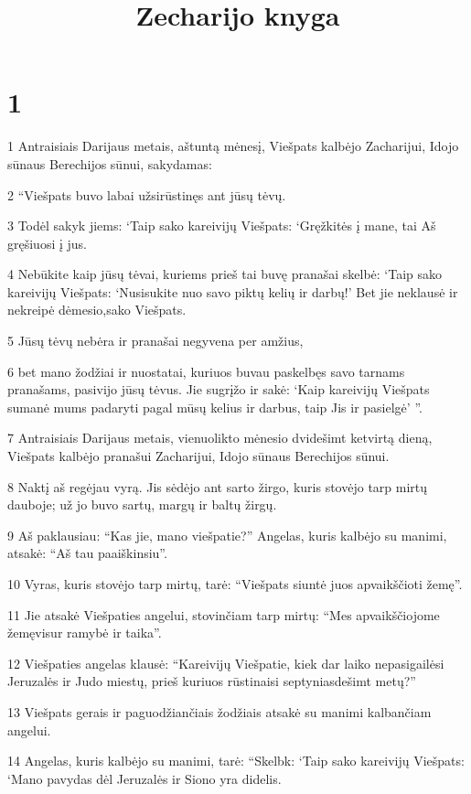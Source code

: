 

\title{Zecharijo knyga}

\chapter{1}


\par 1 Antraisiais Darijaus metais, aštuntą mėnesį, Viešpats kalbėjo Zacharijui, Idojo sūnaus Berechijos sūnui, sakydamas: 
\par 2 “Viešpats buvo labai užsirūstinęs ant jūsų tėvų. 
\par 3 Todėl sakyk jiems: ‘Taip sako kareivijų Viešpats: ‘Gręžkitės į mane, tai Aš gręšiuosi į jus. 
\par 4 Nebūkite kaip jūsų tėvai, kuriems prieš tai buvę pranašai skelbė: ‘Taip sako kareivijų Viešpats: ‘Nusisukite nuo savo piktų kelių ir darbų!’ Bet jie neklausė ir nekreipė dėmesio,­sako Viešpats.­ 
\par 5 Jūsų tėvų nebėra ir pranašai negyvena per amžius, 
\par 6 bet mano žodžiai ir nuostatai, kuriuos buvau paskelbęs savo tarnams pranašams, pasivijo jūsų tėvus. Jie sugrįžo ir sakė: ‘Kaip kareivijų Viešpats sumanė mums padaryti pagal mūsų kelius ir darbus, taip Jis ir pasielgė’ ”. 
\par 7 Antraisiais Darijaus metais, vienuolikto mėnesio dvidešimt ketvirtą dieną, Viešpats kalbėjo pranašui Zacharijui, Idojo sūnaus Berechijos sūnui. 
\par 8 Naktį aš regėjau vyrą. Jis sėdėjo ant sarto žirgo, kuris stovėjo tarp mirtų dauboje; už jo buvo sartų, margų ir baltų žirgų. 
\par 9 Aš paklausiau: “Kas jie, mano viešpatie?” Angelas, kuris kalbėjo su manimi, atsakė: “Aš tau paaiškinsiu”. 
\par 10 Vyras, kuris stovėjo tarp mirtų, tarė: “Viešpats siuntė juos apvaikščioti žemę”. 
\par 11 Jie atsakė Viešpaties angelui, stovinčiam tarp mirtų: “Mes apvaikščiojome žemę­visur ramybė ir taika”. 
\par 12 Viešpaties angelas klausė: “Kareivijų Viešpatie, kiek dar laiko nepasigailėsi Jeruzalės ir Judo miestų, prieš kuriuos rūstinaisi septyniasdešimt metų?” 
\par 13 Viešpats gerais ir paguodžiančiais žodžiais atsakė su manimi kalbančiam angelui. 
\par 14 Angelas, kuris kalbėjo su manimi, tarė: “Skelbk: ‘Taip sako kareivijų Viešpats: ‘Mano pavydas dėl Jeruzalės ir Siono yra didelis. 
